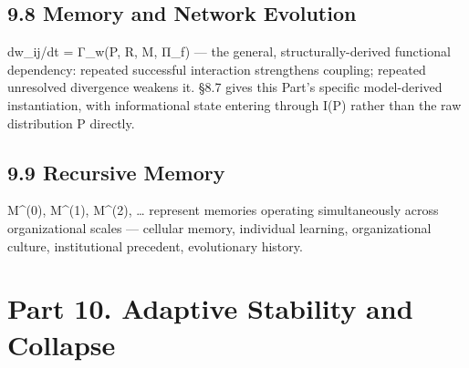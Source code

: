 \documentclass[
]{article}
\begin{document}
\hypertarget{memory-and-network-evolution}{%
\subsection{9.8 Memory and Network
Evolution}\label{memory-and-network-evolution}}

dw\_ij/dt = Γ\_w(P, R, M, Π\_f) --- the general, structurally-derived
functional dependency: repeated successful interaction strengthens
coupling; repeated unresolved divergence weakens it. §8.7 gives this
Part's specific model-derived instantiation, with informational state
entering through I(P) rather than the raw distribution P directly.

\hypertarget{recursive-memory}{%
\subsection{9.9 Recursive Memory}\label{recursive-memory}}

M\^{}(0), M\^{}(1), M\^{}(2), \ldots{} represent memories operating
simultaneously across organizational scales --- cellular memory,
individual learning, organizational culture, institutional precedent,
evolutionary history.

\hypertarget{part-10.-adaptive-stability-and-collapse}{%
\section{Part 10. Adaptive Stability and
Collapse}\label{part-10.-adaptive-stability-and-collapse}}
\end{document}
